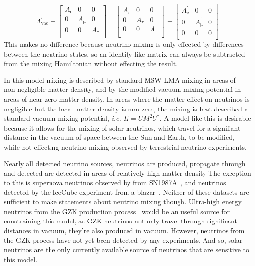 \begin{equation}
A_{\mathrm{vac}}^{\prime} =
\begin{bmatrix}
    A_{\mathrm{e}} & 0 & 0  \\
    0 &  A_{\mathrm{\mu}} & 0  \\
    0 & 0 &  A_{\mathrm{\tau}}  \\
\end{bmatrix} - 
\begin{bmatrix}
    A_{\mathrm{\tau}} & 0 & 0  \\
    0 &  A_{\mathrm{\tau}} & 0  \\
    0 & 0 &  A_{\mathrm{\tau}}  \\ 
\end{bmatrix} 
= 
\begin{bmatrix}
    A_{\mathrm{e}}^{\prime} & 0 & 0  \\
    0 &  A_{\mathrm{\mu}}^{\prime} & 0  \\
    0 & 0 &  0  \\ 
\end{bmatrix}  
\end{equation}
This makes no difference because neutrino mixing is only effected by differences
between the neutrino states, so an identity-like matrix can always be subtracted
from the mixing Hamiltonian without effecting the result.

In this model mixing is described by standard MSW-LMA mixing in areas of
non-negligible matter density, and by the modified vacuum mixing potential
in areas of near zero matter density.
In areas where the matter effect on neutrinos is negligible but the local
matter density is non-zero, the mixing is best described a standard
vacuum mixing potential, \textit{i.e.} $H = UM^{2}U^{\dagger}$.
A model like this is desirable because it allows for the mixing of solar neutrinos, which
travel for a signifiant distance in the vacuum of space between the Sun and Earth,
to be modified, while not effecting neutrino mixing observed by terrestrial neutrino experiments.

Nearly all detected neutrino sources, neutrinos are produced, propagate through
 and detected are detected in areas of relatively high matter density
The exception to this is supernova neutrinos observed by from SN1987A~\citep{kamiokande_sn, imb_sn, baksan_sn},
and neutrinos detected by the IceCube experiment from a blazar~\citep{icecube_blazar}.
Neither of these datasets are sufficient to make statements
about neutrino mixing though.
Ultra-high energy neutrinos from the GZK production process~\citep{gzk} would be an useful
source for constraining this model, as GZK neutrinos not only travel through
significant distances in vacuum, they're also produced in vacuum.
However, neutrinos from the GZK process have not yet been detected by
any experiments.
And so, solar neutrinos are the only currently available source
of neutrinos that are sensitive to this model.


